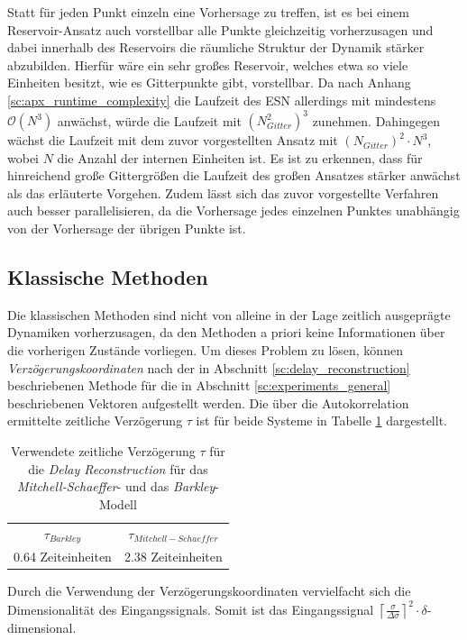 Statt für jeden Punkt einzeln eine Vorhersage zu treffen, ist es bei einem Reservoir-Ansatz auch vorstellbar alle Punkte gleichzeitig vorherzusagen und dabei innerhalb des Reservoirs die räumliche Struktur der Dynamik stärker abzubilden. Hierfür wäre ein sehr großes Reservoir, welches etwa so viele Einheiten besitzt, wie es Gitterpunkte gibt, vorstellbar. Da nach Anhang \ref{sc:apx_runtime_complexity} die Laufzeit des \textsc{ESN} allerdings mit mindestens $\mathcal{O}(N^{3})$ anwächst, würde die Laufzeit mit $(N_{Gitter}^2)^{3}$ zunehmen. Dahingegen wächst die Laufzeit mit dem zuvor vorgestellten Ansatz mit $(N_{Gitter})^2 \cdot N^{3}$, wobei $N$ die Anzahl der internen Einheiten ist. Es ist zu erkennen, dass für hinreichend große Gittergrößen die Laufzeit des großen Ansatzes stärker anwächst als das erläuterte Vorgehen. Zudem lässt sich das zuvor vorgestellte Verfahren auch besser parallelisieren, da die Vorhersage jedes einzelnen Punktes unabhängig von der Vorhersage der übrigen Punkte ist.   

\FloatBarrier
\subsection{Klassische Methoden}
\label{sec:experiments_general_classical}
Die klassischen Methoden sind nicht von alleine in der Lage zeitlich ausgeprägte Dynamiken vorherzusagen, da den Methoden a priori keine Informationen über die vorherigen Zustände vorliegen. Um dieses Problem zu lösen, können \textit{Verzögerungskoordinaten} nach der in Abschnitt \ref{sc:delay_reconstruction} beschriebenen Methode für die in Abschnitt \ref{sc:experiments_general} beschriebenen Vektoren aufgestellt werden. Die über die Autokorrelation ermittelte zeitliche Verzögerung $\tau$ ist für beide Systeme in Tabelle \ref{tab:delay_reconstruction_tau} dargestellt.     

\begin{table}[h]
\centering
\begin{tabular}{cc}
\hline
$\tau_{Barkley}$ & $\tau_{Mitchell-Schaeffer}$ \\ 
0.64 Zeiteinheiten & 2.38 Zeiteinheiten\\ 
\hline 
\end{tabular} 
\caption{Verwendete zeitliche Verzögerung $\tau$ für die \textit{Delay Reconstruction} für das \textit{Mitchell-Schaeffer}- und das \textit{Barkley}-Modell}
\label{tab:delay_reconstruction_tau}
\end{table} 

Durch die Verwendung der Verzögerungskoordinaten vervielfacht sich die Dimensionalität des Eingangssignals. Somit ist das Eingangssignal $\left \lceil \frac{\sigma}{\Delta\sigma} \right \rceil^2 \cdot \delta$-dimensional. 



